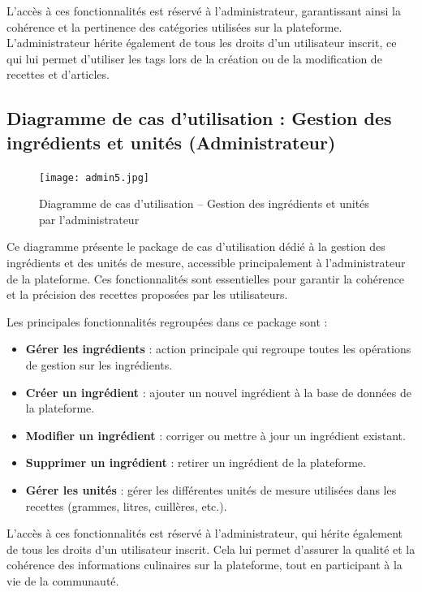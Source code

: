 \documentclass[12pt,a4paper]{report}
\begin{document}
L’accès à ces fonctionnalités est réservé à l’administrateur, garantissant ainsi la cohérence et la pertinence des catégories utilisées sur la plateforme. L’administrateur hérite également de tous les droits d’un utilisateur inscrit, ce qui lui permet d’utiliser les tags lors de la création ou de la modification de recettes et d’articles.
\subsection{Diagramme de cas d’utilisation : Gestion des ingrédients et unités (Administrateur)}

\begin{figure}[H]
    \centering
    \texttt{[image: admin5.jpg]}
    \caption{Diagramme de cas d’utilisation – Gestion des ingrédients et unités par l’administrateur}
    \label{fig:usecase_admin_ingredients}
\end{figure}

Ce diagramme présente le package de cas d’utilisation dédié à la gestion des ingrédients et des unités de mesure, accessible principalement à l’administrateur de la plateforme. Ces fonctionnalités sont essentielles pour garantir la cohérence et la précision des recettes proposées par les utilisateurs.

Les principales fonctionnalités regroupées dans ce package sont :
\begin{itemize}
    \item \textbf{Gérer les ingrédients} : action principale qui regroupe toutes les opérations de gestion sur les ingrédients.
    \item \textbf{Créer un ingrédient} : ajouter un nouvel ingrédient à la base de données de la plateforme.
    \item \textbf{Modifier un ingrédient} : corriger ou mettre à jour un ingrédient existant.
    \item \textbf{Supprimer un ingrédient} : retirer un ingrédient de la plateforme.
    \item \textbf{Gérer les unités} : gérer les différentes unités de mesure utilisées dans les recettes (grammes, litres, cuillères, etc.).
\end{itemize}

L’accès à ces fonctionnalités est réservé à l’administrateur, qui hérite également de tous les droits d’un utilisateur inscrit. Cela lui permet d’assurer la qualité et la cohérence des informations culinaires sur la plateforme, tout en participant à la vie de la communauté.
\end{document}
